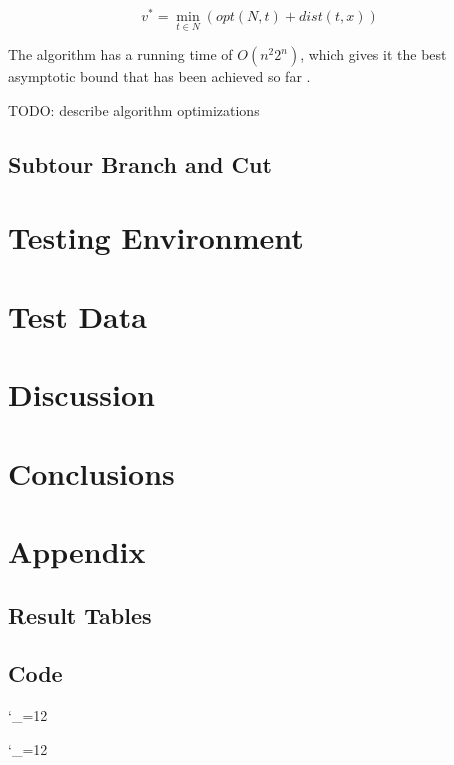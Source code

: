 \documentclass[11pt]{article}
\newcommand{\code}{\begingroup
  \catcode`_=12 \docode}
\newcommand{\docode}[2]{
	\begin{framed}
	\end{framed}\endgroup}
\begin{document}
\[ v^* = \min_{t \in N} ( opt(N , t) + dist(t, x) ) \]

The algorithm has a running time of $O(n^2 2^n)$, which gives it the best asymptotic bound that has been achieved so far \cite{bico}.

TODO: describe algorithm optimizations

\subsection{Subtour Branch and Cut}

\section{Testing Environment}
\label{sec:environment}

\section{Test Data}
\label{sec:data}

\section{Discussion}
\label{sec:discussion}

\section{Conclusions}
\label{sec:conclusions}


\nocite{*}



\section*{Appendix}
\subsection*{Result Tables}
\subsection*{Code}
\code{../onetree.h}{C++}
\code{../onetree.cpp}{C++}


\end{document}
